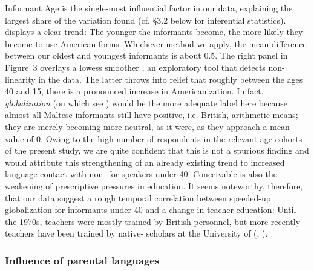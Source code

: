 \documentclass[output=paper]{langsci/langscibook}
\begin{document}
Informant Age is the single-most influential factor in our data, explaining the largest share of the variation found (cf. §3.2 below for inferential statistics).  displays a clear trend: The younger the informants become, the more likely they become to use American forms. Whichever method we apply, the mean difference between our oldest and youngest informants is about 0.5. The right panel in Figure~3 overlays a lowess smoother \citep{Cleveland1979}, an exploratory tool that detects non-linearity in the data. The latter throws into relief that roughly between the ages 40 and 15, there is a pronounced increase in Americanization. In fact, \textit{globalization} (on which see \citealt{Krugetal2016}) would be the more adequate label here because almost all Maltese informants still have positive, i.e. British, arithmetic means; they are merely becoming more neutral, as it were, as they approach a mean value of 0. Owing to the high number of respondents in the relevant age cohorts of the present study, we are quite confident that this is not a spurious finding and would attribute this strengthening of an already existing trend to increased language contact with non- for speakers under 40. Conceivable is also the weakening of prescriptive  pressures in education. It seems noteworthy, therefore, that our data suggest a rough temporal correlation between speeded-up globalization for informants under 40 and a change in teacher education: Until the 1970s, teachers were mostly trained by British personnel, but more recently teachers have been trained by   native- scholars at the University of  (\citealt[192]{Calleja1994}, \citealt[2]{MartinelliRaykov2014}). 



\subsubsection{Influence of parental languages}
\end{document}
